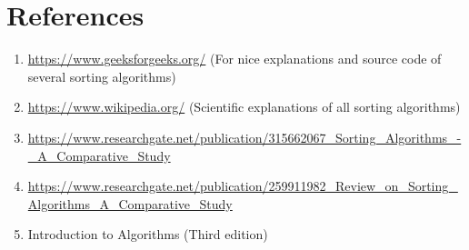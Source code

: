 \documentclass[11pt,a4paper]{article}
\begin{document}
\section{References}
\begin{enumerate}
  \item \url{https://www.geeksforgeeks.org/} (For nice explanations and source code of several sorting algorithms)\\
  \item \url{https://www.wikipedia.org/} (Scientific explanations of all sorting algorithms)\\
  \item \url{https://www.researchgate.net/publication/315662067_Sorting_Algorithms_-_A_Comparative_Study}\\
  \item \url{https://www.researchgate.net/publication/259911982_Review_on_Sorting_Algorithms_A_Comparative_Study}\\
  \item Introduction to Algorithms (Third edition)\\
\end{enumerate}
\end{document}
